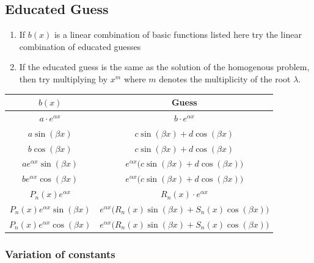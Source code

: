 \documentclass[8pt]{extarticle}
\begin{document}
\begin{multicols*}{3}
  \subsection{Educated Guess}
  \begin{enumerate}[label=(\arabic*)]
    \item If $b(x)$ is a linear combination of basic functions listed
          here try the linear combination of educated guesses
    \item If the educated guess is the same as the solution
          of the homogenous problem, then try multiplying by $x^m$
          where $m$ denotes the multiplicity of the root $\lambda$.
  \end{enumerate}
  \begin{center}
    \begin{tabular}{|c|c|}
      \hline
      $b(x)$                              & Guess                                                                  \\ \hline
      $a \cdot e^{\alpha x}$              & $b \cdot e^{\alpha x}$                                                 \\ \hline
      $a \sin(\beta x)$                   & $c \sin(\beta x) + d \cos(\beta x)$                                    \\ \hline
      $b \cos(\beta x)$                   & $c \sin(\beta x) + d \cos(\beta x)$                                    \\ \hline
      $a e^{\alpha x} \sin(\beta x)$      & $e^{\alpha x} \Big( c \sin(\beta x) + d \cos(\beta x) \Big)$           \\ \hline
      $b e^{\alpha x} \cos(\beta x)$      & $e^{\alpha x} \Big( c \sin(\beta x) + d \cos(\beta x) \Big)$           \\ \hline
      $P_n(x) e^{\alpha x}$               & $R_n(x) \cdot e^{\alpha x}$                                            \\ \hline
      $P_n(x) e^{\alpha x} \sin(\beta x)$ & $e^{\alpha x} \Big( R_n(x) \sin(\beta x) + S_n(x) \cos(\beta x) \Big)$ \\ \hline
      $P_n(x) e^{\alpha x} \cos(\beta x)$ & $e^{\alpha x} \Big( R_n(x) \sin(\beta x) + S_n(x) \cos(\beta x) \Big)$ \\ \hline
    \end{tabular}
  \end{center}

    \subsubsection {Variation of constants}
  

\end{multicols*}
\end{document}
